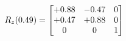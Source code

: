 \documentclass[preview]{standalone}
\begin{document}
\begin{align*}
\special{dvisvgm:raw <g id='unique000'>}R_{z}(0.49) = \begin{bmatrix}+0.88 & -0.47 & 0 \\+0.47 & +0.88 & 0 \\0 & 0 & 1\end{bmatrix}\special{dvisvgm:raw </g>}
\end{align*}
\end{document}
